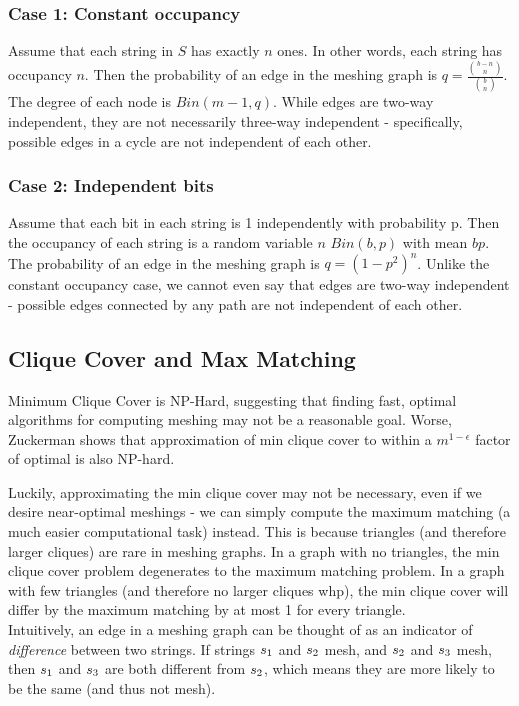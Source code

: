 \subsubsection{Case 1: Constant occupancy}
Assume that each string in $S$ has exactly $n$ ones.  In other words, each string has occupancy $n$.  Then the probability of an edge in the meshing graph is $q = \frac{{{b-n}\choose{n}}}{{{b}\choose{n}}}$.  The degree of each node is \texttildelow $Bin(m-1,q)$.  While edges are two-way independent, they are not necessarily three-way independent - specifically, possible edges in a cycle are not independent of each other.

\subsubsection{Case 2: Independent bits}
Assume that each bit in each string is 1 independently with probability p.  Then the occupancy of each string is a random variable $n$ \texttildelow $Bin(b, p)$ with mean $bp$.  The probability of an edge in the meshing graph is $q = (1-p^2)^n$.  Unlike the constant 
occupancy case, we cannot even say that edges are two-way independent - possible edges connected by any path are not independent of each other.

\subsection{Clique Cover and Max Matching}
Minimum Clique Cover is NP-Hard, suggesting that finding fast, optimal algorithms for computing meshing may not be a reasonable goal.  Worse, Zuckerman \cite{zuckerman07} shows that approximation of min clique cover to within a $m^{1-\epsilon}$ factor of optimal is also NP-hard.

Luckily, approximating the min clique cover may not be necessary, even if we desire near-optimal meshings - we can simply compute the maximum matching (a much easier computational task) instead.  This is because triangles (and therefore larger cliques) are rare in meshing graphs.  In a graph with no triangles, the min clique cover problem degenerates to the maximum matching problem.  In a graph with few triangles (and therefore no larger cliques whp), the min clique cover will differ by the maximum matching by at most 1 for every triangle.\\

Intuitively, an edge in a meshing graph can be thought of as an indicator of \textit{difference} between two strings.  If strings $s_1$ and $s_2$ mesh, and $s_2$ and $s_3$ mesh, then $s_1$ and $s_3$ are both different from $s_2$, which means they are more likely to be the same (and thus not mesh).

